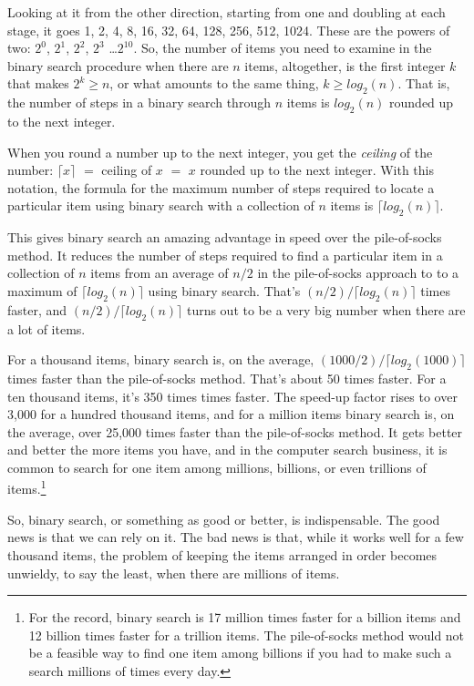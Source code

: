 Looking at it from the other direction, starting from one
and doubling at each stage, it goes 1, 2, 4, 8, 16, 32, 64,
128, 256, 512, 1024. These are the powers of two:
$2^0$, $2^1$, $2^2$, $2^3$ \dots $2^{10}$.
So, the number of items you need to examine
in the binary search procedure
when there are $n$ items, altogether, is the
first integer $k$ that makes $2^k \geq n$, or
what amounts to the same thing, $k \geq log_2(n)$.
That is, the number of steps in a
binary search through
$n$ items is $log_2(n)$ rounded up
to the next integer.

When you round a number up to the next integer, you get the
\emph{ceiling}
of the number:
$\lceil x \rceil$ $=$ ceiling of $x$ $=$ $x$ rounded up to the next integer.
With this notation, the formula for the maximum number of steps
required to locate a particular item using
binary search with a collection of $n$ items
is $\lceil log_2(n) \rceil$.

This gives binary search an amazing
advantage in speed over the pile-of-socks method.
It reduces the number of steps required to find a particular item
in a collection of $n$ items from an average of $n/2$
in the pile-of-socks approach to
to a maximum of $\lceil log_2(n) \rceil$
using binary search.
That's $(n/2)/\lceil log_2(n) \rceil$ times faster,
and $(n/2)/\lceil log_2(n) \rceil$ turns
out to be a very big number when there are a lot of items.

For a thousand items,
binary search is, on the average,
$(1000/2)/\lceil log_2(1000) \rceil$ times faster than the pile-of-socks method.
That's about 50 times faster.
For a ten thousand items, it's 350 times times faster.
The speed-up factor rises to over 3,000 for a hundred thousand items,
and for a million items binary search is, on the average,
over 25,000 times faster than the pile-of-socks method.
It gets better and better the more items you have,
and in the computer search business, it is common to search for one item among
millions, billions, or even trillions of items.\footnote{For the record,
binary search is 17 million times faster for a billion items
and 12 billion times faster for a trillion items.
The pile-of-socks method would not be a feasible way
to find one item among billions if you had to make such a search
millions of times every day.}

So, binary search, or something as good or better, is indispensable.
The good news is that we can rely on it.
The bad news is that, while it works
well for a few thousand items, the problem of
keeping the items arranged in order
becomes unwieldy, to say the least, when there are
millions of items.

